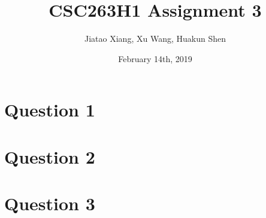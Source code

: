 \documentclass[10pt]{article}
\title{CSC263H1 Assignment 3}
\author{Jiatao Xiang, Xu Wang, Huakun Shen}
\date{February 14th, 2019}
\begin{document}
\maketitle

\section*{Question 1}


\section*{Question 2}


\section*{Question 3}
\end{document}
